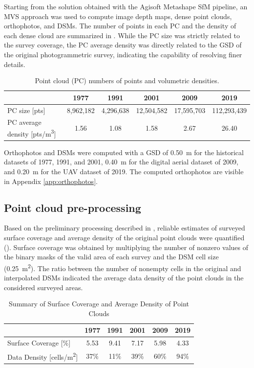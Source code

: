 Starting from the solution obtained with the Agisoft Metashape SfM pipeline, an MVS approach was used to compute image depth maps, dense point clouds, orthophotos, and DSMs. 
The number of points in each PC and the density of each dense cloud are summarized in .
While the PC size was strictly related to the survey coverage, the PC average density was directly related to the GSD of the original photogrammetric survey, indicating the capability of resolving finer details.

\begin{table}
    \centering
    \caption{Point cloud (PC) numbers of points and volumetric densities.}
    \label{tab:2:pcd_density}
    \begin{tabular}{lccccc}
        \hline
        & 1977 & 1991 & 2001 & 2009 & 2019 \\
        \hline
        PC size [pts] & 8,962,182 & 4,296,638 & 12,504,582 & 17,595,703 & 112,293,439 \\
        PC average density [pts/m\textsuperscript{3}] & 1.56 & 1.08 & 1.58 & 2.67 & 26.40 \\
        \hline
    \end{tabular}
\end{table}

Orthophotos and DSMs were computed with a GSD of \SI{0.50}{\meter} for the historical datasets of 1977, 1991, and 2001, \SI{0.40}{\meter} for the digital aerial dataset of 2009, and \SI{0.20}{\meter} for the UAV dataset of 2019.
The computed orthophotos are visible in Appendix \ref{app:orthophotos}.

\subsection{Point cloud pre-processing}\label{sec:2:res_preproc}

Based on the preliminary processing described in , reliable estimates of surveyed surface coverage and average density of the original point clouds were quantified ().
Surface coverage was obtained by multiplying the number of nonzero values of the binary masks of the valid area of each survey and the DSM cell size (\SI{0.25}{\square\meter}). 
The ratio between the number of nonempty cells in the original and interpolated DSMs indicated the average data density of the point clouds in the considered surveyed areas. 

\begin{table}[ht]
  \centering
  \caption{Summary of Surface Coverage and Average Density of Point Clouds}
  \label{tab:2:pcd_surface_coverage}
  \begin{tabular}{lccccc}
    \hline
    & 1977 & 1991 & 2001 & 2009 & 2019 \\
    \hline
    Surface Coverage [\%] & 5.53 & 9.41 & 7.17 & 5.98 & 4.33 \\
    Data Density [cells/m\textsuperscript{2}] & 37\% & 11\% & 39\% & 60\% & 94\% \\
    \hline
  \end{tabular}
\end{table}

